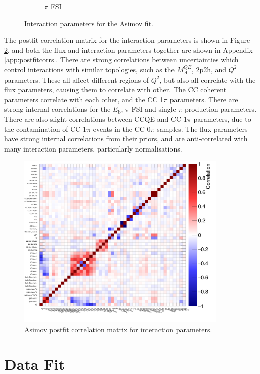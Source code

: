 \begin{figure}[!htbp]
\begin{subfigure}{0.49\textwidth}
  \caption{$\pi$ FSI}
\end{subfigure}
\caption{Interaction parameters for the Asimov fit.}
\label{fig:asmvxsec}
\end{figure}

The postfit correlation matrix for the interaction parameters is shown in Figure \ref{fig:asmvpostfitcovXsec}, and both the flux and interaction parameters together are shown in Appendix \ref{app:postfitcorrs}. There are strong correlations between uncertainties which control interactions with similar topologies, such as the $M^{QE}_A$, 2p2h, and $Q^2$ parameters. These all affect different regions of $Q^2$, but also all correlate with the flux parameters, causing them to correlate with other. The CC coherent parameters correlate with each other, and the CC 1$\pi$ parameters. There are strong internal correlations for the $E_{\mathrm{b}}$, $\pi$ FSI and single $\pi$ production parameters. There are also slight correlations between CCQE and CC 1$\pi$ parameters, due to the contamination of CC $1\pi$ events in the CC 0$\pi$ samples. The flux parameters have strong internal correlations from their priors, and are anti-correlated with many interaction parameters, particularly normalisations.

\begin{figure}
\centering
\includegraphics*[width=0.9\textwidth,clip]{figs/Mach3AsmvCorrXsec}
\caption{Asimov postfit correlation matrix for interaction parameters.}\label{fig:asmvpostfitcovXsec}
\end{figure}

\section{Data Fit}\label{sec:datafit}

